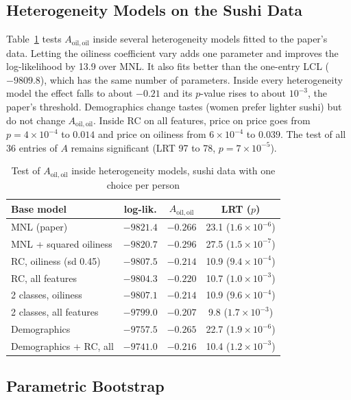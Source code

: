 \documentclass[11pt,journal,a4paper]{IEEEtran}
\newcommand{\Aoo}{A_{\mathrm{oil,oil}}}
\begin{document}
\subsection{Heterogeneity Models on the Sushi Data}

Table~\ref{tab:real} tests $\Aoo$ inside several heterogeneity models fitted to the paper's data. Letting the
oiliness coefficient vary adds one parameter and improves the log-likelihood by 13.9 over MNL. It also fits
better than the one-entry LCL ($-9809.8$), which has the same number of parameters. Inside every heterogeneity
model the effect falls to about $-0.21$ and its $p$-value rises to about $10^{-3}$, the paper's threshold.
Demographics change tastes (women prefer lighter sushi) but do not change $\Aoo$. Inside RC on all features,
price on price goes from $p=4\times10^{-4}$ to $0.014$ and price on oiliness from $6\times10^{-4}$ to $0.039$.
The test of all 36 entries of $A$ remains significant (LRT 97 to 78, $p=7\times10^{-5}$).

\begin{table}[!t]
\caption{Test of $\Aoo$ inside heterogeneity models, sushi data with one choice per person}
\label{tab:real}
\centering\footnotesize
\setlength{\tabcolsep}{3pt}
\begin{tabular}{lccc}
\toprule
Base model & log-lik. & $\Aoo$ & LRT ($p$) \\
\midrule
MNL (paper) & $-9821.4$ & $-0.266$ & 23.1 ($1.6\times10^{-6}$) \\
MNL + squared oiliness & $-9820.7$ & $-0.296$ & 27.5 ($1.5\times10^{-7}$) \\
RC, oiliness (sd 0.45) & $-9807.5$ & $-0.214$ & 10.9 ($9.4\times10^{-4}$) \\
RC, all features & $-9804.3$ & $-0.220$ & 10.7 ($1.0\times10^{-3}$) \\
2 classes, oiliness & $-9807.1$ & $-0.214$ & 10.9 ($9.6\times10^{-4}$) \\
2 classes, all features & $-9799.0$ & $-0.207$ & 9.8 ($1.7\times10^{-3}$) \\
Demographics & $-9757.5$ & $-0.265$ & 22.7 ($1.9\times10^{-6}$) \\
Demographics + RC, all & $-9741.0$ & $-0.216$ & 10.4 ($1.2\times10^{-3}$) \\
\bottomrule
\end{tabular}
\end{table}

\subsection{Parametric Bootstrap}
\end{document}
